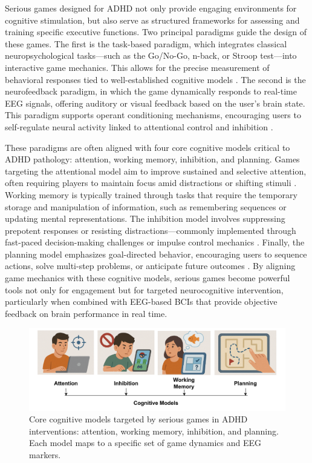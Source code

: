 Serious games designed for ADHD not only provide engaging environments for cognitive stimulation, but also serve as structured frameworks for assessing and training specific executive functions. Two principal paradigms guide the design of these games. The first is the task-based paradigm, which integrates classical neuropsychological tasks—such as the Go/No-Go, n-back, or Stroop test—into interactive game mechanics. This allows for the precise measurement of behavioral responses tied to well-established cognitive models \cite{Fang2025}. The second is the neurofeedback paradigm, in which the game dynamically responds to real-time EEG signals, offering auditory or visual feedback based on the user’s brain state. This paradigm supports operant conditioning mechanisms, encouraging users to self-regulate neural activity linked to attentional control and inhibition \cite{Firouzabadi2022}. 

These paradigms are often aligned with four core cognitive models critical to ADHD pathology: attention, working memory, inhibition, and planning. Games targeting the attentional model aim to improve sustained and selective attention, often requiring players to maintain focus amid distractions or shifting stimuli \cite{Chen2024}. Working memory is typically trained through tasks that require the temporary storage and manipulation of information, such as remembering sequences or updating mental representations. The inhibition model involves suppressing prepotent responses or resisting distractions—commonly implemented through fast-paced decision-making challenges or impulse control mechanics \cite{Takahashi2024, BreitlingZiegler2020}. Finally, the planning model emphasizes goal-directed behavior, encouraging users to sequence actions, solve multi-step problems, or anticipate future outcomes \cite{Lorini2022}. By aligning game mechanics with these cognitive models, serious games become powerful tools not only for engagement but for targeted neurocognitive intervention, particularly when combined with EEG-based BCIs that provide objective feedback on brain performance in real time.


\begin{figure}[h]
 \centering
 \includegraphics[width=1\textwidth]{Cap 1/Figures/cognitive.pdf}
 \caption{Core cognitive models targeted by serious games in ADHD interventions: attention, working memory, inhibition, and planning. Each model maps to a specific set of game dynamics and EEG markers.}
 \label{fig:cognitive_models}
\end{figure}



